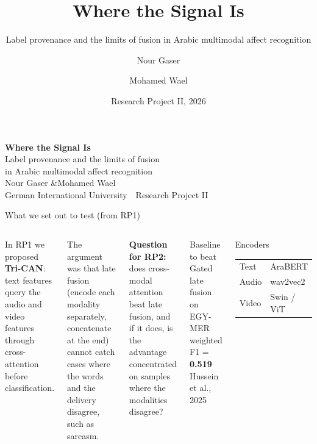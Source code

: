 \documentclass[aspectratio=169,10pt]{beamer}
\title{Where the Signal Is}
\subtitle{Label provenance and the limits of fusion in Arabic multimodal affect recognition}
\author{Nour Gaser \and Mohamed Wael}
\institute{German International University}
\date{Research Project II, 2026}
\newcommand{\muted}[1]{\textcolor{MutedGray}{#1}}
\begin{document}
{
\begin{frame}[plain]
\vspace{1.2cm}
\begin{center}
{\color{white}\LARGE\bfseries Where the Signal Is}\\[0.3cm]
{\color{AccentBlue!30!white}\large Label provenance and the limits of fusion\\in Arabic multimodal affect recognition}\\[1.1cm]
{\color{white}\normalsize Nour Gaser \quad\&\quad Mohamed Wael}\\[0.15cm]
{\color{white!70}\small German International University \,\textperiodcentered\, Research Project II}
\end{center}
\end{frame}
}

\begin{frame}[t]{What we set out to test (from RP1)}
\begin{columns}[T,onlytextwidth]
In RP1 we proposed \textbf{Tri-CAN}: text features query the audio and video
features through cross-attention before classification.

\vspace{0.4cm}
The argument was that late fusion (encode each modality separately, concatenate
at the end) cannot catch cases where the words and the delivery disagree, such
as sarcasm.

\vspace{0.4cm}
\textbf{Question for RP2:} does cross-modal attention beat late fusion, and if
it does, is the advantage concentrated on samples where the modalities disagree?

\begin{block}{Baseline to beat}
Gated late fusion on EGY-MER\\
weighted F1 = \textbf{0.519}\\
\muted{\footnotesize Hussein et al., 2025}
\end{block}
\begin{block}{Encoders}
\begin{tabular}{@{}ll@{}}
Text & AraBERT \\
Audio & wav2vec2 \\
Video & Swin / ViT \\
\end{tabular}
\end{block}
\end{columns}
\end{frame}
\end{document}
